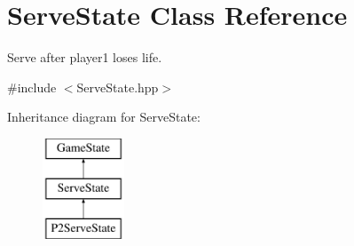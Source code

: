 \hypertarget{class_serve_state}{}\section{Serve\+State Class Reference}
\label{class_serve_state}


Serve after player1 loses life.  




{\ttfamily \#include $<$Serve\+State.\+hpp$>$}

Inheritance diagram for Serve\+State\+:\begin{figure}[H]
\begin{center}
\leavevmode
\includegraphics[height=3.000000cm]{class_serve_state}
\end{center}
\end{figure}
